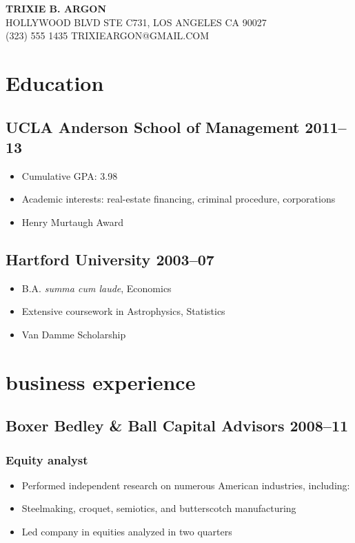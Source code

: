 \documentclass[11pt]{article}
\begin{document}
\begin{center}
  \asans\MakeUppercase{
  {\huge\textbf{Trixie B. Argon}} \\  Hollywood Blvd Ste C731, Los Angeles Ca 90027 \\
  (323) 555 1435 \quad trixieargon@gmail.com }
\end{center}

\section{Education}
	\subsection{UCLA Anderson School of Management \hfill 2011–13}
	\begin{itemize}
		\item Cumulative GPA: 3.98
		\item Academic interests: real-estate financing, criminal procedure, corporations
		\item Henry Murtaugh Award
	\end{itemize}
	
	\subsection{Hartford University \hfill 2003–07}
	\begin{itemize}
		\item B.A. \textit{summa cum laude}, Economics
		\item Extensive coursework in Astrophysics, Statistics
		\item Van Damme Scholarship
	\end{itemize}
	
\section{business experience}
	\subsection{Boxer Bedley \& Ball Capital Advisors \hfill 2008–11}
	\subsubsection{Equity analyst}
	\begin{itemize}
		\item Performed independent research on numerous American industries, including:
		\item Steelmaking, croquet, semiotics, and butterscotch manufacturing
		\item Led company in equities analyzed in two quarters
	\end{itemize}
	
\end{document}

